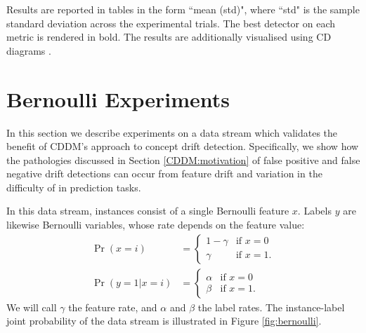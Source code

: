 Results are reported in tables in the form ``mean (std)", where ``std" is the sample standard deviation across the experimental trials. The best detector on each metric is rendered in bold. The results are additionally visualised using CD diagrams \cite{cd_diagrams}.


\section{Bernoulli Experiments} \label{Experiments:bernoulli}

In this section we describe experiments on a data stream which validates the benefit of CDDM's approach to concept drift detection. Specifically, we show how the pathologies discussed in Section \ref{CDDM:motivation} of false positive and false negative drift detections can occur from feature drift and variation in the difficulty of in prediction tasks.


In this data stream, instances consist of a single Bernoulli feature $x$. Labels $y$ are likewise Bernoulli variables, whose rate depends on the feature value:
\begin{align}
  \Pr(x=i) &= \begin{cases}
    1-\gamma & \text{if }x=0 \\
    \gamma & \text{if }x=1.
    \end{cases} \\
  \Pr(y=1|x=i) &= \begin{cases}
    \alpha & \text{if }x=0 \\
    \beta & \text{if }x=1.
    \end{cases}
\end{align}
We will call $\gamma$ the feature rate, and $\alpha$ and $\beta$ the label rates. The instance-label joint probability of the data stream is illustrated in Figure \ref{fig:bernoulli}.

